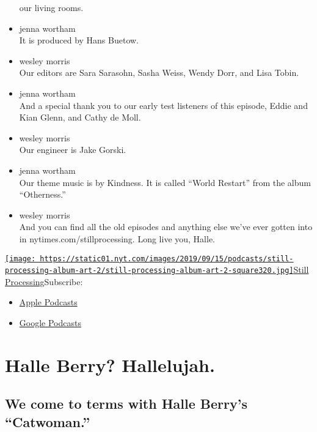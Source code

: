 \begin{itemize}
  our living rooms.
\item
  jenna wortham\\
  It is produced by Hans Buetow.
\item
  wesley morris\\
  Our editors are Sara Sarasohn, Sasha Weiss, Wendy Dorr, and Lisa
  Tobin.
\item
  jenna wortham\\
  And a special thank you to our early test listeners of this episode,
  Eddie and Kian Glenn, and Cathy de Moll.
\item
  wesley morris\\
  Our engineer is Jake Gorski.
\item
  jenna wortham\\
  Our theme music is by Kindness. It is called ``World Restart'' from
  the album ``Otherness.''
\item
  wesley morris\\
  And you can find all the old episodes and anything else we've ever
  gotten into in nytimes.com/stillprocessing. Long live you, Halle.
\end{itemize}

\href{https://www.nytimes.com/column/still-processing-podcast}{\texttt{[image: https://static01.nyt.com/images/2019/09/15/podcasts/still-processing-album-art-2/still-processing-album-art-2-square320.jpg]}Still
Processing}Subscribe:

\begin{itemize}
\tightlist
\item
  \href{https://itunes.apple.com/us/podcast/id1151436460}{Apple
  Podcasts}
\item
  \href{https://www.google.com/podcasts?feed=aHR0cHM6Ly9yc3MuYXJ0MTkuY29tL255dC1zdGlsbC1wcm9jZXNzaW5n}{Google
  Podcasts}
\end{itemize}

\hypertarget{halle-berry-hallelujah-1}{%
\section{Halle Berry? Hallelujah.}\label{halle-berry-hallelujah-1}}

\hypertarget{we-come-to-terms-with-halle-berrys-catwoman-1}{%
\subsection{We come to terms with Halle Berry's
``Catwoman.''}\label{we-come-to-terms-with-halle-berrys-catwoman-1}}

